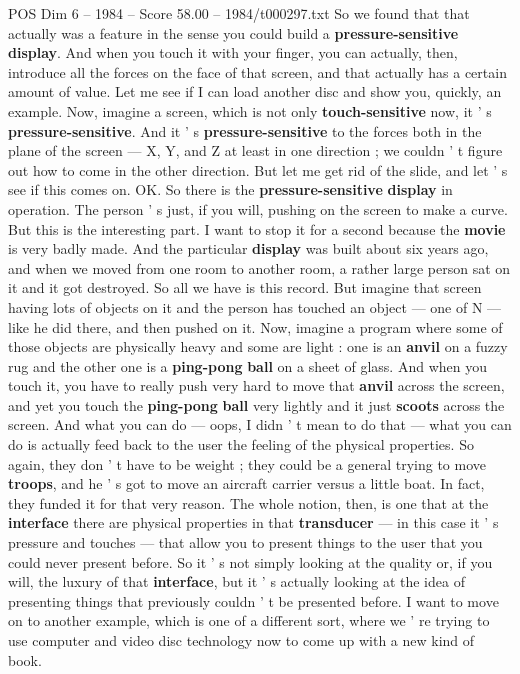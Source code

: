 \begin{textsample}{POS Dim 6 – 1984 – Score 58.00 – 1984/t000297.txt}
So we found that that actually was a feature in the sense you could build a \textbf{pressure-sensitive} \textbf{display}.
And when you touch it with your finger, you can actually, then, introduce all the forces on the face of that screen, and that actually has a certain amount of value.
Let me see if I can load another disc and show you, quickly, an example.
Now, imagine a screen, which is not only \textbf{touch-sensitive} now, it ' s \textbf{pressure-sensitive}.
And it ' s \textbf{pressure-sensitive} to the forces both in the plane of the screen — X, Y, and Z at least in one direction ; we couldn ' t figure out how to come in the other direction.
But let me get rid of the slide, and let ' s see if this comes on.
OK.
So there is the \textbf{pressure-sensitive} \textbf{display} in operation.
The person ' s just, if you will, pushing on the screen to make a curve.
But this is the interesting part.
I want to stop it for a second because the \textbf{movie} is very badly made.
And the particular \textbf{display} was built about six years ago, and when we moved from one room to another room, a rather large person sat on it and it got destroyed.
So all we have is this record.
But imagine that screen having lots of objects on it and the person has touched an object — one of N — like he did there, and then pushed on it.
Now, imagine a program where some of those objects are physically heavy and some are light : one is an \textbf{anvil} on a fuzzy rug and the other one is a \textbf{ping-pong} \textbf{ball} on a sheet of glass.
And when you touch it, you have to really push very hard to move that \textbf{anvil} across the screen, and yet you touch the \textbf{ping-pong} \textbf{ball} very lightly and it just \textbf{scoots} across the screen.
And what you can do — oops, I didn ' t mean to do that — what you can do is actually feed back to the user the feeling of the physical properties.
So again, they don ' t have to be weight ; they could be a general trying to move \textbf{troops}, and he ' s got to move an aircraft carrier versus a little boat.
In fact, they funded it for that very reason.
The whole notion, then, is one that at the \textbf{interface} there are physical properties in that \textbf{transducer} — in this case it ' s pressure and touches — that allow you to present things to the user that you could never present before.
So it ' s not simply looking at the quality or, if you will, the luxury of that \textbf{interface}, but it ' s actually looking at the idea of presenting things that previously couldn ' t be presented before.
I want to move on to another example, which is one of a different sort, where we ' re trying to use computer and video disc technology now to come up with a new kind of book.

\end{textsample}
